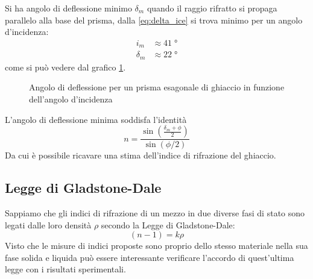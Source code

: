 \documentclass{report}[a4paper,11pt]
\begin{document}
Si ha angolo di deflessione minimo $\delta_m$ quando il raggio rifratto si propaga parallelo alla base del prisma, dalla \eqref{eq:delta_ice} si trova minimo per un angolo d'incidenza:
\begin{align}
i_m &\approx 41 \; \si{\degree} \\
\delta_m &\approx 22 \; \si{\degree}
\end{align}
come si può vedere dal grafico \ref{fig:delta_ice}.
\begin{figure}[!htb]
	\centering
		\scalebox{0.8}{}
	\caption{Angolo di deflessione per un prisma esagonale di ghiaccio in funzione dell'angolo d'incidenza \label{fig:delta_ice}}
\end{figure}
L'angolo di deflessione minima soddisfa l'identità
\begin{equation}\label{eq:prism}
n = \frac{\sin\left(\frac{\delta_m + \phi}{2}\right)}{\sin (\phi/2)}
\end{equation}
Da cui è possibile ricavare una stima dell'indice di rifrazione del ghiaccio.
\subsection{Legge di Gladstone-Dale}
Sappiamo che gli indici di rifrazione di un mezzo in due diverse fasi di stato sono legati dalle loro densità $\rho$ secondo la Legge di Gladstone-Dale:
\begin{equation}\label{eq:Glad}
(n-1) = k \rho
\end{equation}
Visto che le misure di indici proposte sono proprio dello stesso materiale nella sua fase solida e liquida può essere interessante verificare l'accordo di quest'ultima legge con i risultati sperimentali.
\end{document}
